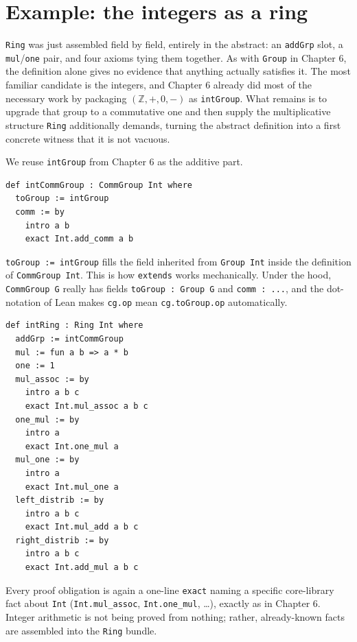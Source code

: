 \section{Example: the integers as a ring}\label{sec:08-rings:04-integers-example:1}

\texttt{Ring} was just assembled field by field, entirely in the abstract: an \texttt{addGrp} slot, a \texttt{mul}/\texttt{one} pair, and four axioms tying them together. As with \texttt{Group} in Chapter 6, the definition alone gives no evidence that anything actually satisfies it. The most familiar candidate is the integers, and Chapter 6 already did most of the necessary work by packaging \((\mathbb{Z}, +, 0, -)\) as \texttt{intGroup}. What remains is to upgrade that group to a commutative one and then supply the multiplicative structure \texttt{Ring} additionally demands, turning the abstract definition into a first concrete witness that it is not vacuous.

We reuse \texttt{intGroup} from Chapter 6 as the additive part.

\begin{lstlisting}
def intCommGroup : CommGroup Int where
  toGroup := intGroup
  comm := by
    intro a b
    exact Int.add_comm a b
\end{lstlisting}

\texttt{toGroup := intGroup} fills the field inherited from \texttt{Group Int} inside the definition of \texttt{CommGroup Int}. This is how \texttt{extends} works mechanically. Under the hood, \texttt{CommGroup G} really has fields \texttt{toGroup : Group G} and \texttt{comm : ...}, and the dot-notation of Lean makes \texttt{cg.op} mean \texttt{cg.toGroup.op} automatically.

\begin{lstlisting}
def intRing : Ring Int where
  addGrp := intCommGroup
  mul := fun a b => a * b
  one := 1
  mul_assoc := by
    intro a b c
    exact Int.mul_assoc a b c
  one_mul := by
    intro a
    exact Int.one_mul a
  mul_one := by
    intro a
    exact Int.mul_one a
  left_distrib := by
    intro a b c
    exact Int.mul_add a b c
  right_distrib := by
    intro a b c
    exact Int.add_mul a b c
\end{lstlisting}

Every proof obligation is again a one-line \texttt{exact} naming a specific core-library fact about \texttt{Int} (\texttt{Int.mul\_\allowbreak{}assoc}, \texttt{Int.one\_\allowbreak{}mul}, \ldots), exactly as in Chapter 6. Integer arithmetic is not being proved from nothing; rather, already-known facts are assembled into the \texttt{Ring} bundle.

